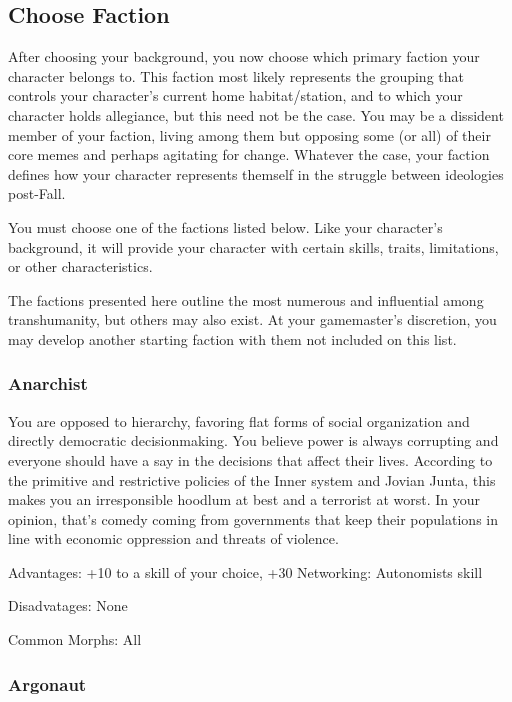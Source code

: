\subsection{Choose Faction} \label{sec:choose-faction} 

After choosing your background, you now choose which primary faction your character belongs to. This faction most likely represents the grouping that controls your character’s current home habitat/station, and to which your character holds allegiance, but this need not be the case. You may be a dissident member of your faction, living among them but opposing some (or all) of their core memes and perhaps agitating for change. Whatever the case, your faction defines how your character represents themself in the struggle between ideologies post-Fall. 

You must choose one of the factions listed below. Like your character’s background, it will provide your character with certain skills, traits, limitations, or other characteristics. 

The factions presented here outline the most numerous and influential among transhumanity, but others may also exist. At your gamemaster’s discretion, you may develop another starting faction with them not included on this list. 

\subsubsection{Anarchist} \label{sec:anarchist} 

You are opposed to hierarchy, favoring flat forms of social organization and directly democratic decisionmaking. You believe power is always corrupting and everyone should have a say in the decisions that affect their lives. According to the primitive and restrictive policies of the Inner system and Jovian Junta, this makes you an irresponsible hoodlum at best and a terrorist at worst. In your opinion, that’s comedy coming from governments that keep their populations in line with economic oppression and threats of violence. 

Advantages: +10 to a skill of your choice, +30 Networking: Autonomists skill 

Disadvatages: None 

Common Morphs: All 

\subsubsection{Argonaut} \label{sec:argonaut} 

